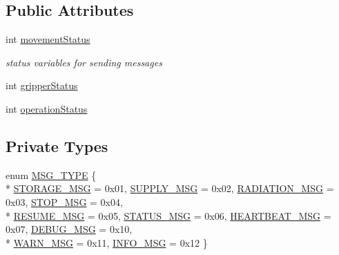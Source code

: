 \subsection*{Public Attributes}
\begin{DoxyCompactItemize}
\item 
int \hyperlink{classBTClient_aacff467239e0a6a85eab0ac77dbcfdf8}{movement\-Status}
\begin{DoxyCompactList}\small\item\em status variables for sending messages \end{DoxyCompactList}\item 
int \hyperlink{classBTClient_acdb5a8d964742a7236d2d0acc2e45585}{gripper\-Status}
\item 
int \hyperlink{classBTClient_a419405603d661e07e630a6649e9592a0}{operation\-Status}
\end{DoxyCompactItemize}
\subsection*{Private Types}
\begin{DoxyCompactItemize}
\item 
enum \hyperlink{classBTClient_aa4e607f3ba1fea67548e2c2864915cb8}{M\-S\-G\-\_\-\-T\-Y\-P\-E} \{ \\*
\hyperlink{classBTClient_aa4e607f3ba1fea67548e2c2864915cb8a79c8b79e1404a0aadda91748f3a5b376}{S\-T\-O\-R\-A\-G\-E\-\_\-\-M\-S\-G} = 0x01, 
\hyperlink{classBTClient_aa4e607f3ba1fea67548e2c2864915cb8a2ec2a5bf9061a6e1fc643474d77dfdf5}{S\-U\-P\-P\-L\-Y\-\_\-\-M\-S\-G} = 0x02, 
\hyperlink{classBTClient_aa4e607f3ba1fea67548e2c2864915cb8a6a321a640ef7a6d5e9bbc48c66f0129f}{R\-A\-D\-I\-A\-T\-I\-O\-N\-\_\-\-M\-S\-G} = 0x03, 
\hyperlink{classBTClient_aa4e607f3ba1fea67548e2c2864915cb8ae247365f4eec434df1965c3c29780a52}{S\-T\-O\-P\-\_\-\-M\-S\-G} = 0x04, 
\\*
\hyperlink{classBTClient_aa4e607f3ba1fea67548e2c2864915cb8acfa47d734d92681292809deb82e0ae66}{R\-E\-S\-U\-M\-E\-\_\-\-M\-S\-G} = 0x05, 
\hyperlink{classBTClient_aa4e607f3ba1fea67548e2c2864915cb8a8b255c625c832b7f355c9797ca1a111c}{S\-T\-A\-T\-U\-S\-\_\-\-M\-S\-G} = 0x06, 
\hyperlink{classBTClient_aa4e607f3ba1fea67548e2c2864915cb8a234efd919c0dd46b09806b30a13b3b76}{H\-E\-A\-R\-T\-B\-E\-A\-T\-\_\-\-M\-S\-G} = 0x07, 
\hyperlink{classBTClient_aa4e607f3ba1fea67548e2c2864915cb8a52e6479fc2514e89e0ab286f4de4e2e7}{D\-E\-B\-U\-G\-\_\-\-M\-S\-G} = 0x10, 
\\*
\hyperlink{classBTClient_aa4e607f3ba1fea67548e2c2864915cb8a67a6a7aadd31c708cb5f53e19137f298}{W\-A\-R\-N\-\_\-\-M\-S\-G} = 0x11, 
\hyperlink{classBTClient_aa4e607f3ba1fea67548e2c2864915cb8af5b0d8cbe53a1d56f6df29fb896047f1}{I\-N\-F\-O\-\_\-\-M\-S\-G} = 0x12
 \}
\end{DoxyCompactItemize}
